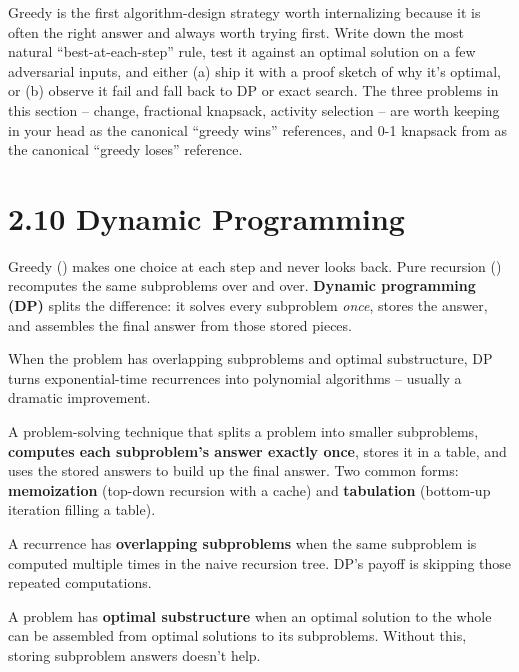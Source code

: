 \documentclass[11pt]{article}
\begin{document}
\begin{ideabox}
Greedy is the first algorithm-design strategy worth internalizing
because it is often the right answer and always worth trying first.
Write down the most natural ``best-at-each-step'' rule, test it
against an optimal solution on a few adversarial inputs, and either
(a) ship it with a proof sketch of why it's optimal, or (b) observe
it fail and fall back to DP or exact search. The three problems in
this section -- change, fractional knapsack, activity selection --
are worth keeping in your head as the canonical ``greedy wins''
references, and 0-1 knapsack from  as the canonical
``greedy loses'' reference.
\end{ideabox}

\section{2.10 Dynamic Programming}

Greedy () makes one choice at each step and never
looks back. Pure recursion () recomputes the same
subproblems over and over. \textbf{Dynamic programming (DP)} splits
the difference: it solves every subproblem \emph{once}, stores the
answer, and assembles the final answer from those stored pieces.

When the problem has overlapping subproblems and optimal
substructure, DP turns exponential-time recurrences into polynomial
algorithms -- usually a dramatic improvement.

\begin{defnbox}
A problem-solving technique that splits a problem into smaller
subproblems, \textbf{computes each subproblem's answer exactly once},
stores it in a table, and uses the stored answers to build up the
final answer. Two common forms: \textbf{memoization} (top-down
recursion with a cache) and \textbf{tabulation} (bottom-up iteration
filling a table).
\end{defnbox}

\begin{defnbox}
A recurrence has \textbf{overlapping subproblems} when the same
subproblem is computed multiple times in the naive recursion tree.
DP's payoff is skipping those repeated computations.
\end{defnbox}

\begin{defnbox}
A problem has \textbf{optimal substructure} when an optimal solution
to the whole can be assembled from optimal solutions to its
subproblems. Without this, storing subproblem answers doesn't help.
\end{defnbox}
\end{document}
